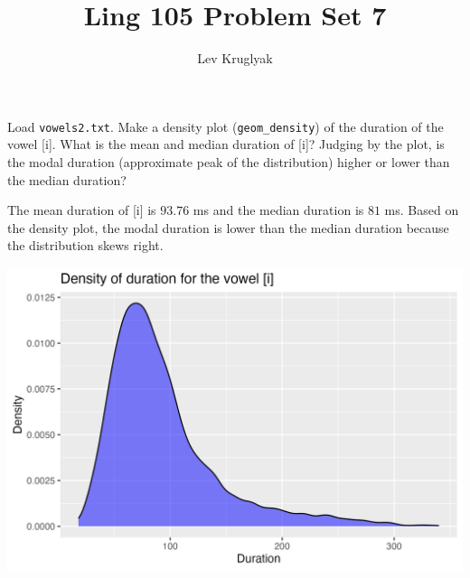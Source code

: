 \documentclass{../../templates/lkx_pset}
\title{Ling 105 Problem Set 7}
\author{Lev Kruglyak}
\begin{document}
\maketitle

\begin{problem}{1}
Load \texttt{vowels2.txt}. Make a density plot (\texttt{geom\_density}) of the duration of the vowel [i]. What is the mean and median duration of [i]? Judging by the plot, is the modal duration (approximate peak of the distribution) higher or lower than the median duration?
\end{problem}

The mean duration of [i] is $93.76$ ms and the median duration is $81$ ms. Based on the density plot, the modal duration is lower than the median duration because the distribution skews right.

\begin{center}
\includegraphics[]{problem1.png}
\end{center}
\end{document}
